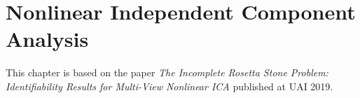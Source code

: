 \chapter{Nonlinear Independent Component Analysis}

\ifpdf
    \graphicspath{{Chapter4/Figs/Raster/}{Chapter4/Figs/PDF/}{Chapter4/Figs/}}
\else
    \graphicspath{{Chapter4/Figs/Vector/}{Chapter4/Figs/}}
\fi

This chapter is based on the paper \emph{The Incomplete Rosetta Stone Problem: Identifiability Results for Multi-View Nonlinear ICA} published at UAI 2019.


\newcommand\independent{\protect\mathpalette{\protect\independenT}{\perp}}
\def\independenT#1#2{\mathrel{\rlap{$#1#2$}\mkern2mu{#1#2}}}


\newcommand*{\affaddr}[1]{#1} \newcommand*{\affmark}[1][*]{\textsuperscript{#1}}

\theoremstyle{definition}

\makeatletter
\newcommand{\printfnsymbol}[1]{  \textsuperscript{\@fnsymbol{#1}}}
\makeatother

%



